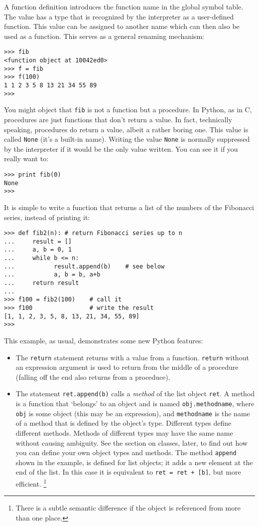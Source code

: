 A function definition introduces the function name in the global symbol
table.
The value has a type that is recognized by the interpreter as a
user-defined function.
This value can be assigned to another name which can then also be used
as a function.
This serves as a general renaming mechanism:
\bcode\begin{verbatim}
>>> fib
<function object at 10042ed0>
>>> f = fib
>>> f(100)
1 1 2 3 5 8 13 21 34 55 89
>>> 
\end{verbatim}\ecode
You might object that
{\tt fib}
is not a function but a procedure.
In Python, as in C, procedures are just functions that don't return a
value.
In fact, technically speaking, procedures do return a value, albeit a
rather boring one.
This value is called {\tt None} (it's a built-in name).
Writing the value {\tt None} is normally suppressed by the interpreter
if it would be the only value written.
You can see it if you really want to:
\bcode\begin{verbatim}
>>> print fib(0)
None
>>> 
\end{verbatim}\ecode
It is simple to write a function that returns a list of the numbers of
the Fibonacci series, instead of printing it:
\bcode\begin{verbatim}
>>> def fib2(n): # return Fibonacci series up to n
...     result = []
...     a, b = 0, 1
...     while b <= n:
...           result.append(b)    # see below
...           a, b = b, a+b
...     return result
... 
>>> f100 = fib2(100)    # call it
>>> f100                # write the result
[1, 1, 2, 3, 5, 8, 13, 21, 34, 55, 89]
>>> 
\end{verbatim}\ecode
This example, as usual, demonstrates some new Python features:
\begin{itemize}
\item
The
{\tt return}
statement returns with a value from a function.
{\tt return}
without an expression argument is used to return from the middle of a
procedure (falling off the end also returns from a proceduce).
\item
The statement
{\tt ret.append(b)}
calls a
{\em method}
of the list object
{\tt ret}.
A method is a function that `belongs' to an object and is named
{\tt obj.methodname},
where
{\tt obj}
is some object (this may be an expression), and
{\tt methodname}
is the name of a method that is defined by the object's type.
Different types define different methods.
Methods of different types may have the same name without causing
ambiguity.
See the section on classes, later, to find out how you can define your
own object types and methods.
The method
{\tt append}
shown in the example, is defined for list objects; it adds a new element
at the end of the list.
In this case it is equivalent to
{\tt ret = ret + [b]},
but more efficient.%
\footnote{
	There is a subtle semantic difference if the object
	is referenced from more than one place.
}
\end{itemize}
